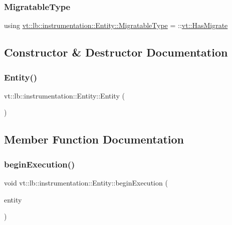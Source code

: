 \subsubsection{\texorpdfstring{Migratable\+Type}{MigratableType}}
{\footnotesize\ttfamily using \hyperlink{structvt_1_1lb_1_1instrumentation_1_1_entity_a40dd6e30c20027d66b9193323d9e0cb0}{vt\+::lb\+::instrumentation\+::\+Entity\+::\+Migratable\+Type} =  \+::\hyperlink{structvt_1_1_has_migrate}{vt\+::\+Has\+Migrate}}



\subsection{Constructor \& Destructor Documentation}
\mbox{\label{structvt_1_1lb_1_1instrumentation_1_1_entity_a08e4ad21f5d3e02d468955a3f0b9f578}} 
\subsubsection{\texorpdfstring{Entity()}{Entity()}}
{\footnotesize\ttfamily vt\+::lb\+::instrumentation\+::\+Entity\+::\+Entity (\begin{DoxyParamCaption}{ }\end{DoxyParamCaption})\hspace{0.3cm}{\ttfamily [default]}}



\subsection{Member Function Documentation}
\mbox{\label{structvt_1_1lb_1_1instrumentation_1_1_entity_a89aef535e92de0f4a4034545c062fd56}} 
\subsubsection{\texorpdfstring{begin\+Execution()}{beginExecution()}}
{\footnotesize\ttfamily void vt\+::lb\+::instrumentation\+::\+Entity\+::begin\+Execution (\begin{DoxyParamCaption}\item[{\hyperlink{namespacevt_a92ec26fb6644cd0ba7eb0ee70c96bee5}{L\+B\+Entity\+Type} const \&}]{entity }\end{DoxyParamCaption})\hspace{0.3cm}{\ttfamily [static]}}

